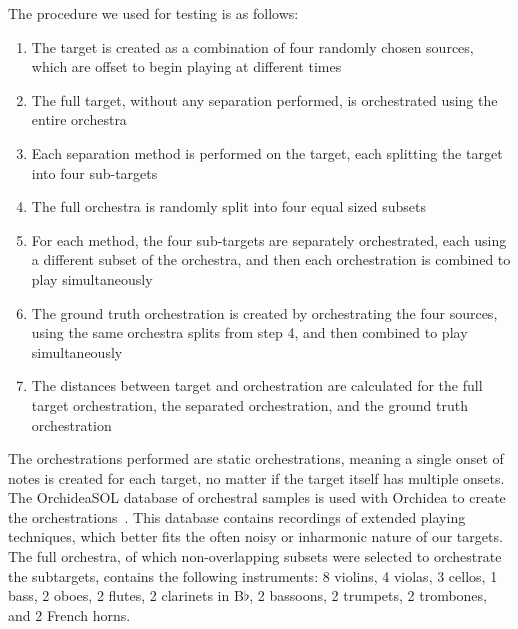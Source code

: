 \documentclass{article}
\begin{document}
		The procedure we used for testing is as follows:
		\begin{enumerate}
			\item The target is created as a combination of four randomly chosen sources, which are offset to begin playing at different times
			\item The full target, without any separation performed, is orchestrated using the entire orchestra
			\item Each separation method is performed on the target, each splitting the target into four sub-targets 
			\item The full orchestra is randomly split into four equal sized subsets
			\item For each method, the four sub-targets are separately orchestrated, each using a different subset of the orchestra, and then each orchestration is combined to play simultaneously
			\item The ground truth orchestration is created by orchestrating the four sources, using the same orchestra splits from step 4, and then combined to play simultaneously
			\item The distances between target and orchestration are calculated for the full target orchestration, the separated orchestration, and the ground truth orchestration 
		\end{enumerate}	
		
		The orchestrations performed are static orchestrations, meaning a single onset of notes is created for each target, no matter if the target itself has multiple onsets. The OrchideaSOL database of orchestral samples is used with Orchidea to create the orchestrations~\cite{Cella2020c}. This database contains recordings of extended playing techniques, which better fits the often noisy or inharmonic nature of our targets. The full orchestra, of which non-overlapping subsets were selected to orchestrate the subtargets, contains the following instruments: 8 violins, 4 violas, 3 cellos, 1 bass, 2 oboes, 2 flutes, 2 clarinets in B$\flat$, 2 bassoons, 2 trumpets, 2 trombones, and 2 French horns.
		
\end{document}
